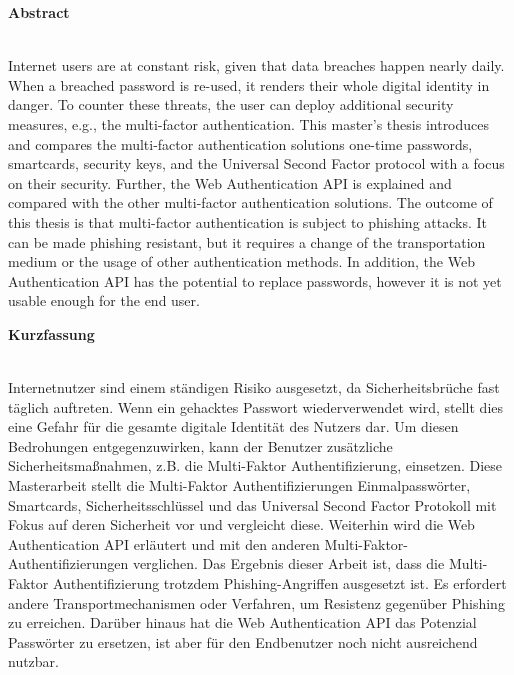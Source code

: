 \thispagestyle{noheader}
\setlength{\columnsep}{1cm}

{}

\begin{multicols}{2}
	\begin{large}
		\textbf{Abstract} \\ \\
	\end{large}
	Internet users are at constant risk, given that data breaches happen nearly daily. When a breached password is re-used, it renders their whole digital identity in danger. To counter these threats, the user can deploy additional security measures, e.g., the multi-factor authentication. This master's thesis introduces and compares the multi-factor authentication solutions one-time passwords, smartcards, security keys, and the Universal Second Factor protocol with a focus on their security. Further, the Web Authentication API is explained and compared with the other multi-factor authentication solutions. The outcome of this thesis is that multi-factor authentication is subject to phishing attacks. It can be made phishing resistant, but it requires a change of the transportation medium or the usage of other authentication methods. In addition, the Web Authentication API has the potential to replace passwords, however it is not yet usable enough for the end user.
	\columnbreak \\
	\begin{large}
		\textbf{Kurzfassung} \\ \\
	\end{large}
	Internetnutzer sind einem ständigen Risiko ausgesetzt, da Sicherheitsbrüche fast täglich auftreten. Wenn ein gehacktes Passwort wiederverwendet wird, stellt dies eine Gefahr für die gesamte digitale Identität des Nutzers dar. Um diesen Bedrohungen entgegenzuwirken, kann der Benutzer zusätzliche Sicherheitsmaßnahmen, z.B. die Multi-Faktor Authentifizierung, einsetzen. Diese Masterarbeit stellt die Multi-Faktor Authentifizierungen Einmalpasswörter, Smartcards, Sicherheitsschlüssel und das Universal Second Factor Protokoll mit Fokus auf deren Sicherheit vor und vergleicht diese. Weiterhin wird die Web Authentication API erläutert und mit den anderen Multi-Faktor-Authentifizierungen verglichen. Das Ergebnis dieser Arbeit ist, dass die Multi-Faktor Authentifizierung trotzdem Phishing-Angriffen ausgesetzt ist. Es erfordert andere Transportmechanismen oder  Verfahren, um Resistenz gegenüber Phishing zu erreichen. Darüber hinaus hat die Web Authentication API das Potenzial Passwörter zu ersetzen, ist aber für den Endbenutzer noch nicht ausreichend nutzbar.
\end{multicols}

\addvspace{1.5cm}


\newpage